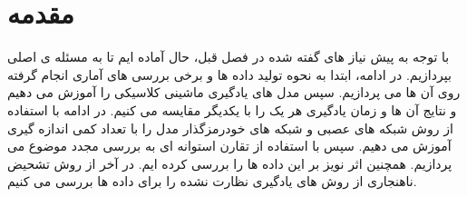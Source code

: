 \section{مقدمه}

با توجه به پیش نیاز های گفته شده در فصل قبل، حال آماده ایم تا به مسئله ی اصلی بپردازیم. در ادامه، ابتدا به نحوه تولید داده ها و برخی بررسی های آماری انجام گرفته روی آن ها می پردازیم.
سپس مدل های یادگیری ماشینی کلاسیکی را آموزش می دهیم و نتایج آن ها و زمان یادگیری هر یک را با یکدیگر مقایسه می کنیم.
در ادامه با استفاده از روش شبکه های عصبی و شبکه های خودرمزگذار مدل را با تعداد کمی اندازه گیری آموزش می دهیم. سپس با استفاده از تقارن استوانه ای به بررسی مجدد موضوع می پردازیم.
همچنین اثر نویز بر این داده ها را بررسی کرده ایم.
در آخر از روش تشحیض ناهنجاری
از روش های یادگیری نظارت نشده را برای داده ها بررسی می کنیم.
